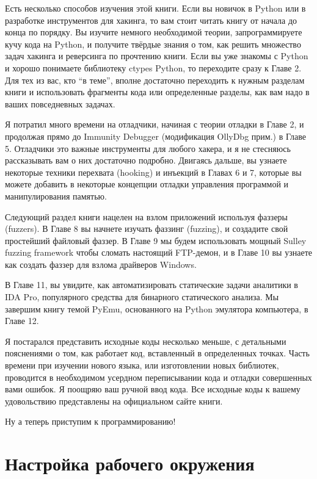 \documentclass[12pt]{book}
\begin{document}
Есть несколько способов изучения этой книги. Если вы новичок в Python или в разработке инструментов для хакинга, то вам стоит читать книгу от начала до конца по порядку. Вы изучите немного необходимой теории, запрограммируете кучу кода на Python, и получите твёрдые знания о том, как решить множество задач хакинга и реверсинга по прочтению книги. Если вы уже знакомы с Python и хорошо понимаете библиотеку ctypes Python, то переходите сразу к Главе 2. Для тех из вас, кто ``в теме'', вполне достаточно переходить к нужным разделам книги и использовать фрагменты кода или определенные разделы, как вам надо в ваших повседневных задачах.

\newpage

Я потратил много времени на отладчики, начиная с теории отладки в Главе 2, и продолжая прямо до Immunity Debugger (модификация OllyDbg прим.) в Главе 5. Отладчики это важные инструменты для любого хакера, и я не стесняюсь рассказывать вам о них достаточно подробно. Двигаясь дальше, вы узнаете некоторые техники перехвата (hooking) и инъекций в Главах 6 и 7, которые вы можете добавить в некоторые концепции отладки управления программой и манипулирования памятью.

Следующий раздел книги нацелен на взлом приложений используя фаззеры (fuzzers). В Главе 8 вы начнете изучать фаззинг (fuzzing), и создадите свой простейший файловый фаззер. В Главе 9 мы будем использовать мощный Sulley fuzzing framework чтобы сломать настоящий FTP-демон, и в Главе 10 вы узнаете как создать фаззер для взлома драйверов Windows.

В Главе 11, вы увидите, как автоматизировать статические задачи аналитики в IDA Pro, популярного средства для бинарного статического анализа. Мы завершим книгу темой PyEmu, основанного на Python эмулятора компьютера, в Главе 12.

Я постарался представить исходные коды несколько меньше, с детальными пояснениями о том, как работает код, вставленный в определенных точках. Часть времени при изучении нового языка, или изготовлении новых библиотек, проводится в необходимом усердном переписывании кода и отладки совершенных вами ошибок. Я поощряю ваш ручной ввод кода. Все исходные коды к вашему удовольствию представлены на официальном сайте книги.

Ну а теперь приступим к программированию!

\newpage
\thispagestyle{empty}

\tableofcontents

\chapter{Настройка рабочего окружения}
\end{document}
